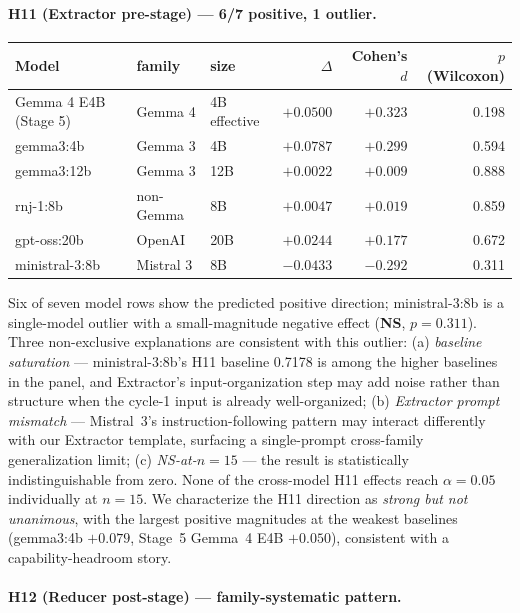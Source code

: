 \documentclass[11pt]{article}
\newcommand{\NS}{\textbf{NS}}
\begin{document}
\paragraph{H11 (Extractor pre-stage) --- 6/7 positive, 1 outlier.}

\begin{table}[h]
\centering
\small
\begin{tabular}{@{}lllrrr@{}}
\toprule
Model & family & size & $\Delta$ & Cohen's $d$ & $p$ (Wilcoxon) \\
\midrule
Gemma 4 E4B (Stage 5) & Gemma 4 & 4B effective & $+0.0500$ & $+0.323$ & 0.198 \\
gemma3:4b & Gemma 3 & 4B & $\mathbf{+0.0787}$ & $+0.299$ & 0.594 \\
gemma3:12b & Gemma 3 & 12B & $+0.0022$ & $+0.009$ & 0.888 \\
rnj-1:8b & non-Gemma & 8B & $+0.0047$ & $+0.019$ & 0.859 \\
gpt-oss:20b & OpenAI & 20B & $+0.0244$ & $+0.177$ & 0.672 \\
ministral-3:8b & Mistral 3 & 8B & $\mathbf{-0.0433}$ & $\mathbf{-0.292}$ & 0.311 \\
\bottomrule
\end{tabular}
\end{table}

Six of seven model rows show the predicted positive direction; ministral-3:8b is a single-model outlier with a small-magnitude negative effect (\NS, $p\!=\!0.311$). Three non-exclusive explanations are consistent with this outlier: (a) \emph{baseline saturation} --- ministral-3:8b's H11 baseline 0.7178 is among the higher baselines in the panel, and Extractor's input-organization step may add noise rather than structure when the cycle-1 input is already well-organized; (b) \emph{Extractor prompt mismatch} --- Mistral~3's instruction-following pattern may interact differently with our Extractor template, surfacing a single-prompt cross-family generalization limit; (c) \emph{NS-at-$n\!=\!15$} --- the result is statistically indistinguishable from zero. None of the cross-model H11 effects reach $\alpha\!=\!0.05$ individually at $n\!=\!15$. We characterize the H11 direction as \emph{strong but not unanimous}, with the largest positive magnitudes at the weakest baselines (gemma3:4b $+0.079$, Stage~5 Gemma~4 E4B $+0.050$), consistent with a capability-headroom story.

\paragraph{H12 (Reducer post-stage) --- family-systematic pattern.}
\end{document}
